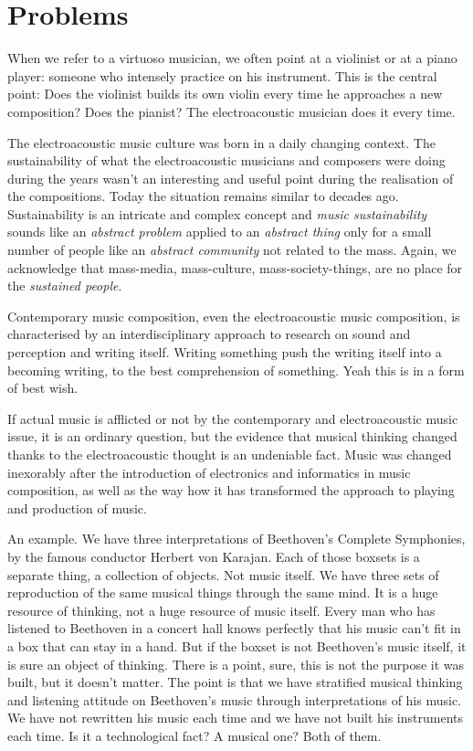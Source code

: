 \documentclass[twoside,a4paper]{article}
\begin{document}
\section{Problems}
\label{sec:problems}

When we refer to a virtuoso musician, we often point at a violinist or at a piano player: someone who intensely practice on his instrument. This is the central point: Does the violinist builds its own violin every time he approaches a new composition? Does the pianist? The electroacoustic musician does it every time.

The electroacoustic music culture was born in a daily changing context. The sustainability of what the electroacoustic musicians and composers were doing during the years wasn't an interesting and useful point during the realisation of the compositions. Today the situation remains similar to decades ago. Sustainability is an intricate and complex concept and \emph{music sustainability} sounds like an \emph{abstract problem} applied to an \emph{abstract thing} only for a small number of people like an \emph{abstract community} not related to the mass. Again, we acknowledge that mass-media, mass-culture, mass-society-things, are no place for the \emph{sustained people}.

Contemporary music composition, even the electroacoustic music composition, is characterised by an interdisciplinary approach to research on sound and perception and writing itself. Writing something push the writing itself into a becoming writing, to the best comprehension of something. Yeah this is in a form of best wish.

If actual music is afflicted or not by the contemporary and electroacoustic music issue, it is an ordinary question, but the evidence that musical thinking changed thanks to the electroacoustic thought is an undeniable fact. Music was changed inexorably after the introduction of electronics and informatics in music composition, as well as the way how it has transformed the approach to playing and production of music.

An example. We have three interpretations of Beethoven's Complete Symphonies, by the famous conductor Herbert von Karajan. Each of those boxsets is a separate thing, a collection of objects. Not music itself. We have three sets of reproduction of the same musical things through the same mind. It is a huge resource of thinking, not a huge resource of music itself. Every man who has listened to Beethoven in a concert hall knows perfectly that his music can't fit in a box that can stay in a hand. But if the boxset is not Beethoven's music itself, it is sure an object of thinking. There is a point, sure, this is not the purpose it was built, but it doesn't matter. The point is that we have stratified musical thinking and listening attitude on Beethoven's music through interpretations of his music. We have not rewritten his music each time and we have not built his instruments each time. Is it a technological fact? A musical one? Both of them.
\end{document}
